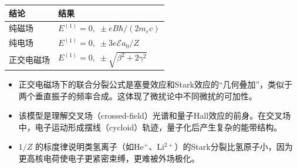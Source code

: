 \begin{formulabox}[答案汇总]
\begin{center}
\begin{tabular}{ll}
\toprule
\textbf{结论} & \textbf{结果} \\
\midrule
纯磁场 & $E^{(1)}=0,\;\pm eB\hbar/(2m_ec)$ \\
纯电场 & $E^{(1)}=0,\;\pm3e\mathcal{E}a_0/Z$ \\
正交电磁场 & $E^{(1)}=0,\;\pm\sqrt{\beta^2+2\gamma^2}$ \\
\bottomrule
\end{tabular}
\end{center}
\end{formulabox}

\begin{insightbox}[物理图像]
\begin{itemize}
    \item 正交电磁场下的联合分裂公式是塞曼效应和Stark效应的``几何叠加''，类似于两个垂直振子的频率合成。这体现了微扰论中不同微扰的可加性。
    \item 该模型是理解交叉场（crossed-field）光谱和量子Hall效应的前身。在交叉场中，电子运动形成摆线（cycloid）轨迹，量子化后产生复杂的能带结构。
    \item $1/Z$ 的标度律说明类氢离子（如He$^+$、Li$^{2+}$）的Stark分裂比氢原子小，因为更高核电荷使电子更紧密束缚，更难被外场极化。
\end{itemize}
\end{insightbox}

